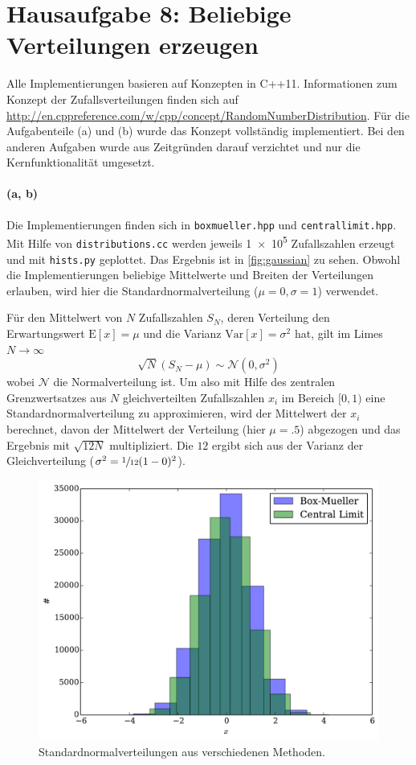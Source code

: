 \documentclass{scrartcl}
\begin{document}
\section*{Hausaufgabe 8: Beliebige Verteilungen erzeugen}
Alle Implementierungen basieren auf Konzepten in C++11. Informationen zum Konzept der Zufallsverteilungen finden sich auf \url{http://en.cppreference.com/w/cpp/concept/RandomNumberDistribution}. Für die Aufgabenteile (a) und (b) wurde das Konzept vollständig implementiert. Bei den anderen Aufgaben wurde aus Zeitgründen darauf verzichtet und nur die Kernfunktionalität umgesetzt.

\paragraph{(a, b)} Die Implementierungen finden sich in \texttt{boxmueller.hpp} und \texttt{centrallimit.hpp}. Mit Hilfe von \texttt{distributions.cc} werden jeweils \num{1e5} Zufallszahlen erzeugt und mit \texttt{hists.py} geplottet. Das Ergebnis ist in \autoref{fig:gaussian} zu sehen. Obwohl die Implementierungen beliebige Mittelwerte und Breiten der Verteilungen erlauben, wird hier die Standardnormalverteilung ($\mu = 0, \sigma = 1$) verwendet.

Für den Mittelwert von $N$ Zufallszahlen $S_N$, deren Verteilung den Erwartungswert $\mathrm{E}[x] = \mu$ und die Varianz $\mathrm{Var}[x] = \sigma^2$ hat, gilt im Limes $N \to \infty$
\begin{equation}
    \sqrt{N}(S_N - \mu) \sim \mathcal{N}(0, \sigma^2)
\end{equation}
wobei $\mathcal{N}$ die Normalverteilung ist. Um also mit Hilfe des zentralen Grenzwertsatzes aus $N$ gleichverteilten Zufallszahlen $x_i$ im Bereich $[0, 1)$ eine Standardnormalverteilung zu approximieren, wird der Mittelwert der $x_i$ berechnet, davon der Mittelwert der Verteilung (hier $\mu = \num{.5}$) abgezogen und das Ergebnis mit $\sqrt{12N}$ multipliziert. Die $12$ ergibt sich aus der Varianz der Gleichverteilung ($\sigma^2 = \sfrac{1}{12}(1 - 0)^2$).

\begin{figure}[H]
    \centering
    \includegraphics[width=.5\textwidth]{plots/gaussian.pdf}
    \caption{Standardnormalverteilungen aus verschiedenen Methoden.}
    \label{fig:gaussian}
\end{figure}
\end{document}
